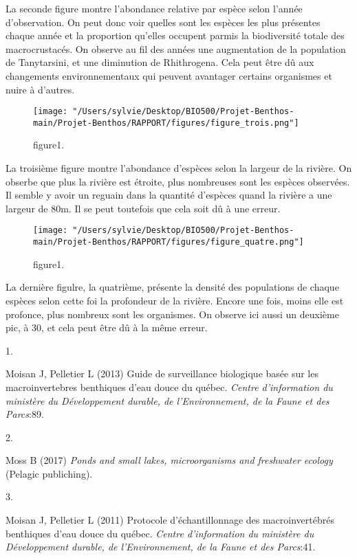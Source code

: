\documentclass[9pt,twocolumn,twoside,]{pnas-new}
\newlength{\cslhangindent}
\newlength{\csllabelwidth}
\newlength{\cslentryspacingunit} %
\newenvironment{CSLReferences}[2] %
 {%
  \setlength{\parindent}{0pt}
  \ifodd #1
  \let\oldpar\par
  \def\par{\hangindent=\cslhangindent\oldpar}
  \fi
  \setlength{\parskip}{#2\cslentryspacingunit}
 }%
 {}
\newcommand{\CSLLeftMargin}[1]{\parbox[t]{\csllabelwidth}{#1}}
\newcommand{\CSLRightInline}[1]{\parbox[t]{\linewidth - \csllabelwidth}{#1}\break}
\begin{document}
La seconde figure montre l'abondance relative par espèce selon l'année
d'observation. On peut donc voir quelles sont les espèces les plus
présentes chaque année et la proportion qu'elles occupent parmis la
biodiversité totale des macrocrustacés. On observe au fil des années une
augmentation de la population de Tanytarsini, et une diminution de
Rhithrogena. Cela peut être dû aux changements environnementaux qui
peuvent avantager certains organismes et nuire à d'autres.

\begin{figure}
\centering
\texttt{[image: "/Users/sylvie/Desktop/BIO500/Projet-Benthos-main/Projet-Benthos/RAPPORT/figures/figure\_trois.png"]}
\caption{figure1. \label{fig1}}
\end{figure}

La troisième figure montre l'abondance d'espèces selon la largeur de la
rivière. On obserbe que plus la rivière est étroite, plus nombreuses
sont les espèces observées. Il semble y avoir un reguain dans la
quantité d'espèces quand la rivière a une largeur de 80m. Il se peut
toutefois que cela soit dû à une erreur.

\begin{figure}
\centering
\texttt{[image: "/Users/sylvie/Desktop/BIO500/Projet-Benthos-main/Projet-Benthos/RAPPORT/figures/figure\_quatre.png"]}
\caption{figure1. \label{fig1}}
\end{figure}

La dernière figulre, la quatrième, présente la densité des populations
de chaque espèces selon cette foi la profondeur de la rivière. Encore
une fois, moins elle est profonce, plus nombreux sont les organismes. On
observe ici aussi un deuxième pic, à 30, et cela peut être dû à la même
erreur.

\showmatmethods
\showacknow
\pnasbreak

\hypertarget{refs}{}
\begin{CSLReferences}{0}{0}
\leavevmode{}%
\CSLLeftMargin{1. }%
\CSLRightInline{Moisan J, Pelletier L (2013) Guide de surveillance
biologique basée sur les macroinvertebres benthiques d'eau douce du
québec. \emph{Centre d'information du ministère du Développement
durable, de l'Environnement, de la Faune et des Parcs}:89.}

\leavevmode{}%
\CSLLeftMargin{2. }%
\CSLRightInline{Moss B (2017) \emph{Ponds and small lakes,
microorganisms and freshwater ecology} (Pelagic publiching).}

\leavevmode{}%
\CSLLeftMargin{3. }%
\CSLRightInline{Moisan J, Pelletier L (2011) Protocole d'échantillonnage
des macroinvertébrés benthiques d'eau douce du québec. \emph{Centre
d'information du ministère du Développement durable, de l'Environnement,
de la Faune et des Parcs}:41.}

\end{CSLReferences}



% 
\end{document}
